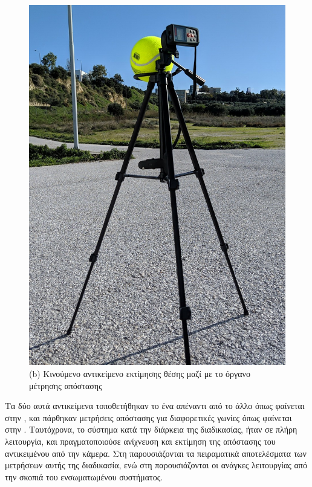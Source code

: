 \begin{figure} [H]
\begin{minipage}{.5\textwidth}
      \includegraphics[width=\linewidth, angle =-90]{../Images/Experiments-Results/testing.jpg}\\ \vspace{0.1cm}
      {(b) Κινούμενο αντικείμενο εκτίμησης θέσης μαζί με το όργανο μέτρησης απόστασης }
	\end{minipage}
    \hfill \break
    \decoRule
    \label{fig:node-testing-env}
\end{figure}

Τα δύο αυτά αντικείμενα τοποθετήθηκαν το ένα απέναντι από το άλλο όπως φαίνεται στην , και πάρθηκαν μετρήσεις απόστασης για διαφορετικές γωνίες όπως φαίνεται στην 
. Ταυτόχρονα, το σύστημα κατά την διάρκεια της διαδικασίας, ήταν σε πλήρη λειτουργία, και πραγματοποιούσε ανίχνευση και εκτίμηση της απόστασης του αντικειμένου από την κάμερα. Στη
 παρουσιάζονται τα πειραματικά αποτελέσματα των μετρήσεων αυτής της διαδικασία, ενώ στη 
 παρουσιάζονται οι ανάγκες λειτουργίας από την σκοπιά του ε\-νσω\-μα\-τω\-μέ\-νου συστήματος.

